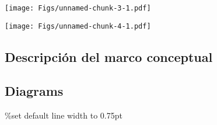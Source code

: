 \documentclass[
  american,
]{article}
\begin{document}
\texttt{[image: Figs/unnamed-chunk-3-1.pdf]}

\texttt{[image: Figs/unnamed-chunk-4-1.pdf]}

\hypertarget{descripciuxf3n-del-marco-conceptual}{%
\subsection{Descripción del marco
conceptual}\label{descripciuxf3n-del-marco-conceptual}}

\hypertarget{diagrams}{%
\subsection{Diagrams}\label{diagrams}}


\%set default line width to 0.75pt
\end{document}
